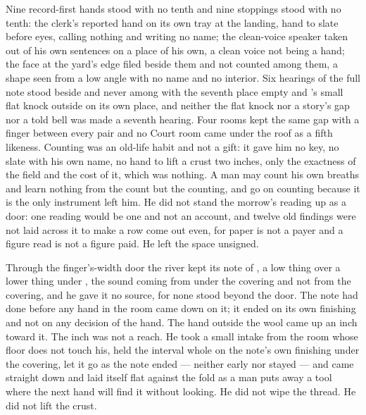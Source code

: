 Nine record-first hands stood with no tenth and nine stoppings stood with no tenth: the clerk's reported hand on its own tray at the landing, hand to slate before eyes, calling nothing and writing no name; the clean-voice speaker taken out of his own sentences on a place of his own, a clean voice not being a hand; the face at the yard's edge filed beside them and not counted among them, a shape seen from a low angle with no name and no interior. Six hearings of the full note stood beside and never among with the seventh place empty and 's small flat knock outside on its own place, and neither the flat knock nor a story's gap nor a told bell was made a seventh hearing. Four rooms kept the same gap with a finger between every pair and no Court room came under the roof as a fifth likeness. Counting was an old-life habit and not a gift: it gave him no key, no slate with his own name, no hand to lift a crust two inches, only the exactness of the field and the cost of it, which was nothing. A man may count his own breaths and learn nothing from the count but the counting, and go on counting because it is the only instrument left him. He did not stand the morrow's reading up as a door: one reading would be one and not an account, and twelve old findings were not laid across it to make a row come out even, for paper is not a payer and a figure read is not a figure paid. He left the space unsigned.

Through the finger's-width door the river kept its note of , a low thing over a lower thing under , the sound coming from under the covering and not from the covering, and he gave it no source, for none stood beyond the door. The note had done before any hand in the room came down on it; it ended on its own finishing and not on any decision of the hand. The hand outside the wool came up an inch toward it. The inch was not a reach. He took a small intake from the room whose floor does not touch his, held the interval whole on the note's own finishing under the covering, let it go as the note ended --- neither early nor stayed --- and came straight down and laid itself flat against the fold as a man puts away a tool where the next hand will find it without looking. He did not wipe the thread. He did not lift the crust.


